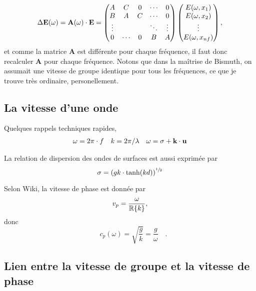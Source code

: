 \documentclass[10pt]{article}
\numberwithin{equation}{section}
\newcommand{\uu}{\vb{u}}
\begin{document}
\begin{equation}
   \Delta \mathbf{E}(\omega) = \mathbf{A}(\omega)\cdot\vb{E} = \begin{pmatrix}
       A & C & 0 & \cdots & 0 \\
       B & A & C & \cdots & 0 \\
       \vdots & & & \ddots & \vdots\\
       0 & \cdots & 0 & B & A \\
     \end{pmatrix}\begin{pmatrix}
       E(\omega,x_1) \\
       E(\omega,x_2) \\
       \vdots\\
       E(\omega,x_{nf}) \\
     \end{pmatrix},
\end{equation}
et comme la matrice \textbf{A} est différente pour chaque fréquence, il faut donc recalculer \textbf{A} pour chaque fréquence.
Notons que dans la maîtrise de Bismuth, on assumait une vitesse de groupe identique pour tous les fréquences, ce que je trouve très ordinaire, personellement.
\subsection{La vitesse d'une onde}
\label{sec:org5caa36b}
Quelques rappels techniques rapides, 
\begin{align}
   \omega = 2\pi \cdot f && k = 2\pi / \lambda && \omega = \sigma + \mathbf{k}\cdot \uu 
\end{align}

La relation de dispersion des ondes de surfaces est aussi exprimée par
\begin{equation}
   \sigma = \qty(gk\cdot \tanh(kd))^{\sfrac{1}{2}}
\end{equation}

Selon Wiki, la vitesse de phase est donnée par
\begin{equation}
   v_p = \frac{\omega}{\mathbb{R} \qty{k}},
\end{equation}
donc
\begin{equation}
   \boxed{\quad c_p(\omega) = \sqrt{\frac{g}{k}} = \frac{g}{\omega}\quad}.
\end{equation}
\subsection{Lien entre la vitesse de groupe et la vitesse de phase}
\label{sec:org167c655}
\end{document}
